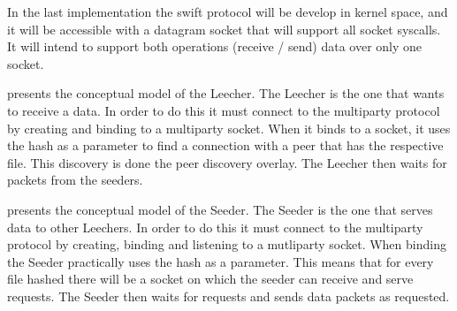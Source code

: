 In the last implementation the swift protocol will be develop in kernel space, and it will be accessible with a
datagram socket that will support all socket syscalls. It will intend to support both operations (receive / send) data
over only one socket.


 presents the conceptual model of the Leecher. The Leecher is the one that wants
to receive a data. In order to do this it must connect to the multiparty protocol by creating and binding to a
multiparty socket. When it binds to a socket, it uses the hash as a parameter to find a connection with a peer that
has the respective file. This discovery is done the peer discovery overlay. The Leecher then waits for packets
from the seeders.
 



 presents the conceptual model of the Seeder. The Seeder is the one that serves
data to other Leechers. In order to do this it must connect to the multiparty protocol by creating, binding and
listening to a mutliparty socket. When binding the Seeder practically uses the hash as a parameter. This means that
for every file hashed there will be a socket on which the seeder can receive and serve requests. The Seeder then waits
for requests and sends data packets as requested.
